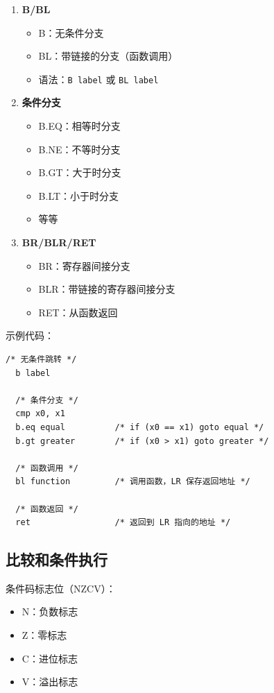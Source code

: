 
\begin{enumerate}
  \item \textbf{B/BL}
    \begin{itemize}
      \item B：无条件分支
      \item BL：带链接的分支（函数调用）
      \item 语法：\texttt{B label} 或 \texttt{BL label}
    \end{itemize}

  \item \textbf{条件分支}
    \begin{itemize}
      \item B.EQ：相等时分支
      \item B.NE：不等时分支
      \item B.GT：大于时分支
      \item B.LT：小于时分支
      \item 等等
    \end{itemize}

  \item \textbf{BR/BLR/RET}
    \begin{itemize}
      \item BR：寄存器间接分支
      \item BLR：带链接的寄存器间接分支
      \item RET：从函数返回
    \end{itemize}
\end{enumerate}

示例代码：
\begin{lstlisting}[language={[ARM]Assembler}]
  /* 无条件跳转 */
  b label

  /* 条件分支 */
  cmp x0, x1
  b.eq equal          /* if (x0 == x1) goto equal */
  b.gt greater        /* if (x0 > x1) goto greater */

  /* 函数调用 */
  bl function         /* 调用函数，LR 保存返回地址 */

  /* 函数返回 */
  ret                 /* 返回到 LR 指向的地址 */
\end{lstlisting}

\subsection{比较和条件执行}


条件码标志位（NZCV）：
\begin{itemize}
  \item N：负数标志
  \item Z：零标志
  \item C：进位标志
  \item V：溢出标志
\end{itemize}


